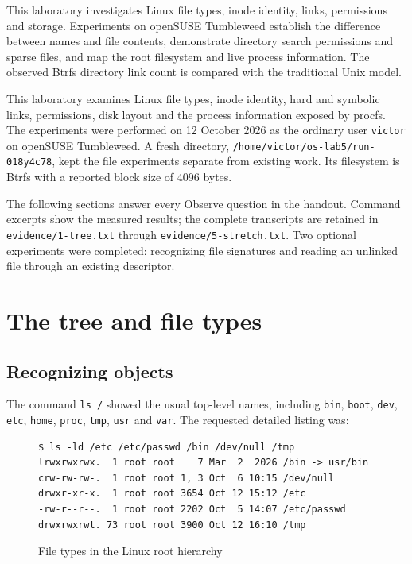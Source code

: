 \documentclass{../latex/utmreport}
\begin{document}
\makeutmreporttitlepage
\tableofcontents
\clearpage
\begin{utmabstract}[Abstract]
This laboratory investigates Linux file types, inode identity, links, permissions and storage. Experiments on openSUSE Tumbleweed establish the difference between names and file contents, demonstrate directory search permissions and sparse files, and map the root filesystem and live process information. The observed Btrfs directory link count is compared with the traditional Unix model.
\end{utmabstract}
\utmintroduction

This laboratory examines Linux file types, inode identity, hard and
symbolic links, permissions, disk layout and the process information
exposed by procfs. The experiments were performed on 12 October 2026 as
the ordinary user \texttt{victor} on openSUSE Tumbleweed. A fresh
directory, \texttt{/home/victor/os-lab5/run-018y4c78}, kept the file
experiments separate from existing work. Its filesystem is Btrfs with a
reported block size of 4096 bytes.

The following sections answer every Observe question in the handout.
Command excerpts show the measured results; the complete transcripts are
retained in \texttt{evidence/1-tree.txt} through
\texttt{evidence/5-stretch.txt}. Two optional experiments were
completed: recognizing file signatures and reading an unlinked file
through an existing descriptor.

\chapter{The tree and file types}\label{the-tree-and-file-types}

\section{Recognizing objects}\label{recognizing-objects}

The command \texttt{ls\ /} showed the usual top-level names, including
\texttt{bin}, \texttt{boot}, \texttt{dev}, \texttt{etc}, \texttt{home},
\texttt{proc}, \texttt{tmp}, \texttt{usr} and \texttt{var}. The
requested detailed listing was:

\begin{figure}[H]
\begin{lstlisting}
$ ls -ld /etc /etc/passwd /bin /dev/null /tmp
lrwxrwxrwx.  1 root root    7 Mar  2  2026 /bin -> usr/bin
crw-rw-rw-.  1 root root 1, 3 Oct  6 10:15 /dev/null
drwxr-xr-x.  1 root root 3654 Oct 12 15:12 /etc
-rw-r--r--.  1 root root 2202 Oct  5 14:07 /etc/passwd
drwxrwxrwt. 73 root root 3900 Oct 12 16:10 /tmp
\end{lstlisting}
\caption{File types in the Linux root hierarchy}
\end{figure}
\end{document}
